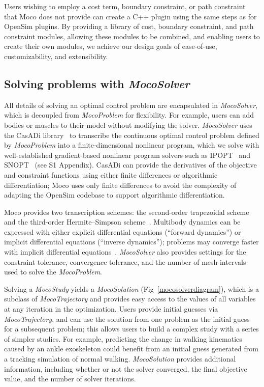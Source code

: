 \documentclass[10pt,letterpaper]{article}
\begin{document}
Users wishing to employ a cost term, boundary constraint, or path constraint that Moco does not provide can create a C++ plugin using the same steps as for OpenSim plugins. By providing a library of cost, boundary constraint, and path constraint modules, allowing these modules to be combined, and enabling users to create their own modules, we achieve our design goals of ease-of-use, customizability, and extensibility.

\subsection*{Solving problems with \textit{MocoSolver}}

All details of solving an optimal control problem are encapsulated in \textit{MocoSolver}, which is decoupled from \textit{MocoProblem} for flexibility. For example, users can add bodies or muscles to their model without modifying the solver. \textit{MocoSolver} uses the CasADi library~\cite{Andersson:2019} to transcribe the continuous optimal control problem defined by \textit{MocoProblem} into a finite-dimensional nonlinear program, which we solve with well-established gradient-based nonlinear program solvers such as IPOPT~\cite{Wachter:2006} and SNOPT~\cite{Gill:2005} (see S1 Appendix). CasADi can provide the derivatives of the objective and constraint functions using either finite differences or algorithmic differentiation; Moco uses only finite differences to avoid the complexity of adapting the OpenSim codebase to support algorithmic differentiation.

Moco provides two transcription schemes: the second-order trapezoidal scheme and the third-order Hermite--Simpson scheme~\cite{Betts:2010}. Multibody dynamics can be expressed with either explicit differential equations (``forward dynamics'') or implicit differential equations (``inverse dynamics''); problems may converge faster with implicit differential equations~\cite{vandenBogert:2011fv,Groote:2016dq}. \textit{MocoSolver} also provides settings for the constraint tolerance, convergence tolerance, and the number of mesh intervals used to solve the \textit{MocoProblem}.

Solving a \textit{MocoStudy} yields a \textit{MocoSolution} (Fig~\ref{mocosolverdiagram}), which is a subclass of \textit{MocoTrajectory} and provides easy access to the values of all variables at any iteration in the optimization. Users provide initial guesses via \textit{MocoTrajectory}, and can use the solution from one problem as the initial guess for a subsequent problem; this allows users to build a complex study with a series of simpler studies. For example, predicting the change in walking kinematics caused by an ankle exoskeleton could benefit from an initial guess generated from a tracking simulation of normal walking. \textit{MocoSolution} provides additional information, including whether or not the solver converged, the final objective value, and the number of solver iterations.
\end{document}
